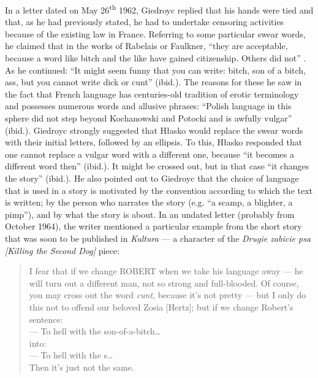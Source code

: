\begin{paper}
In a letter dated on May 26\textsuperscript{th} 1962, Giedroyc replied
that his hands were tied and that, as he had previously stated, he had to
undertake censoring activities because of the existing law in France.
Referring to some particular swear words, he claimed that in the works of Rabelais
or Faulkner, ``they are acceptable, because a word like bitch and
the like have gained citizenship. Others did not'' \citep{hlasko_kor_1962}. As he continued: ``It
might seem funny that you can write: bitch, son of a bitch, ass, but you
cannot write dick or cunt'' (ibid.). The reasons for these he saw in the fact
that French language has centuries-old tradition of erotic terminology
and possesses numerous words and allusive phrases: ``Polish language in
this sphere did not step beyond Kochanowski and Potocki and is awfully
vulgar'' (ibid.). Giedroyc strongly suggested that Hłasko would replace the swear words with
their initial letters, followed by an ellipsis. To this, Hłasko responded that one cannot
replace a vulgar word with a different one, because ``it becomes a
different word then'' (ibid.). It might be crossed out, but in that case ``it changes
the story'' (ibid.). He also pointed out to Giedroyc that the choice of language that is used in a story is motivated by the
convention according to which the text is written; by the person who narrates the story (e.g. ``a scamp, a blighter, a pimp''), and by what the story is
about. In an undated letter (probably from October 1964), the writer mentioned a particular example from the short story
that was soon to be published in \emph{Kultura} --- a character of the
\emph{Drugie zabicie psa [Killing the Second Dog]} piece:

\begin{quote}
I fear that if we change ROBERT when we take his language away --- he
will turn out a different man, not so strong and full-blooded. Of
course, you may cross out the word \emph{cunt}, because it's not pretty
--- but I only do this not to offend our beloved Zosia {[}Hertz{]}; but
if we change Robert's sentence:\\
--- To hell with the son-of-a-bitch\ldots{}{}\\
into:\\
--- To hell with the s\ldots{}\\
Then it's just not the same.
\begin{flushright}
\citep{hlasko_kor_1962}
\end{flushright}
\end{quote}



\end{paper}
